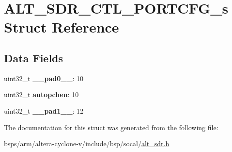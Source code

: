 \hypertarget{structALT__SDR__CTL__PORTCFG__s}{}\section{A\+L\+T\+\_\+\+S\+D\+R\+\_\+\+C\+T\+L\+\_\+\+P\+O\+R\+T\+C\+F\+G\+\_\+s Struct Reference}
\label{structALT__SDR__CTL__PORTCFG__s}
\subsection*{Data Fields}
\begin{DoxyCompactItemize}
\item 
\mbox{\label{structALT__SDR__CTL__PORTCFG__s_aabb781962b388b9e9b480e90bec3defe}} 
uint32\+\_\+t {\bfseries \+\_\+\+\_\+pad0\+\_\+\+\_\+}\+: 10
\item 
\mbox{\label{structALT__SDR__CTL__PORTCFG__s_a21a0d275a727b57db8111445c7eaa9fc}} 
uint32\+\_\+t {\bfseries autopchen}\+: 10
\item 
\mbox{\label{structALT__SDR__CTL__PORTCFG__s_a56338cabe099299f37033bce346c1620}} 
uint32\+\_\+t {\bfseries \+\_\+\+\_\+pad1\+\_\+\+\_\+}\+: 12
\end{DoxyCompactItemize}


The documentation for this struct was generated from the following file\+:\begin{DoxyCompactItemize}
\item 
bsps/arm/altera-\/cyclone-\/v/include/bsp/socal/\mbox{\hyperlink{alt__sdr_8h}{alt\+\_\+sdr.\+h}}\end{DoxyCompactItemize}
